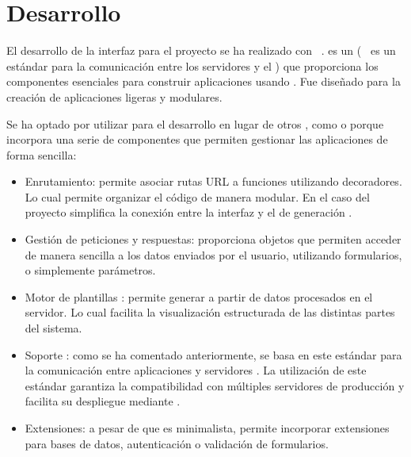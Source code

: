 \section{Desarrollo }
El desarrollo de la interfaz  para el proyecto se ha realizado con ~\cite{herramienta:flask}.  es un   (~\cite{herramienta:wsgi} es un estándar  para la comunicación entre los servidores  y el ) que proporciona los componentes esenciales para construir aplicaciones  usando . Fue diseñado para la creación de aplicaciones  ligeras y modulares. 

Se ha optado por utilizar  para el desarrollo  en lugar de otros , como  o  porque incorpora una serie de componentes que permiten gestionar las aplicaciones  de forma sencilla:
\begin{itemize}
\tightlist
	\item Enrutamiento: permite asociar rutas URL a funciones  utilizando decoradores. Lo cual permite organizar el código de manera modular. En el caso del proyecto simplifica la conexión entre la interfaz  y el  de generación .
	\item Gestión de peticiones y respuestas: proporciona objetos que permiten acceder de manera sencilla a los datos enviados por el usuario, utilizando formularios,  o simplemente parámetros.
	\item Motor de plantillas : permite generar  a partir de datos procesados en el servidor. Lo cual facilita la visualización estructurada de las distintas partes del sistema.
	\item Soporte : como se ha comentado anteriormente,  se basa en este estándar para la comunicación entre aplicaciones  y servidores . La utilización de este estándar garantiza la compatibilidad con múltiples servidores de producción y facilita su despliegue mediante .
	\item Extensiones: a pesar de que es minimalista, permite incorporar extensiones para bases de datos, autenticación o validación de formularios.
\end{itemize}  

